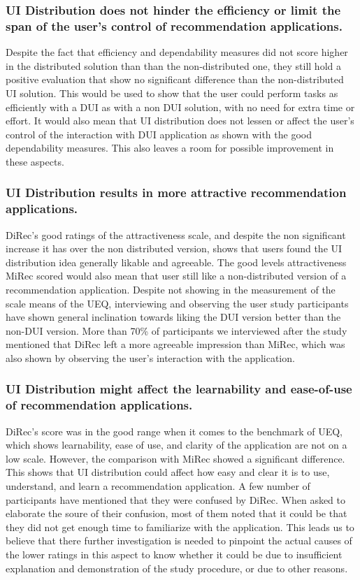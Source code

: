 \subsubsection{UI Distribution does not hinder the efficiency or limit the span
of the user's control of recommendation applications.} Despite the fact that
efficiency and dependability measures did not score higher in the distributed
solution than than the non-distributed one, they still hold a positive
evaluation that show no significant difference than the non-distributed UI
solution. This would be used to show that the user could perform tasks as
efficiently with a DUI as with a non DUI solution, with no need for extra time
or effort. It would also mean that UI distribution does not lessen or affect the
user's control of the interaction with DUI application as shown with the good
dependability measures. This also leaves a room for possible improvement in
these aspects.

\subsubsection{UI Distribution results in more attractive recommendation applications.} DiRec's good ratings of the attractiveness scale, and despite
the non significant increase it has over the non distributed version, shows that
users found the UI distribution idea generally likable and agreeable. The good
levels attractiveness MiRec scored would also mean that user still like a
non-distributed version of a recommendation application. Despite not showing in
the measurement of the scale means of the UEQ, interviewing and observing the
user study participants have shown general inclination towards liking the DUI
version better than the non-DUI version. More than 70\% of participants we
interviewed after the study mentioned that DiRec left a more agreeable
impression than MiRec, which was also shown by observing the user's interaction
with the application.

\subsubsection{UI Distribution might affect the learnability and ease-of-use of recommendation applications.}
DiRec's score was in the good range when it comes to the benchmark of UEQ, which
shows learnability, ease of use, and clarity of the application are not on a low
scale. However, the comparison with MiRec showed a significant difference. This
shows that UI distribution could affect how easy and clear it is to use,
understand, and learn a recommendation application. A few number of participants
have mentioned that they were confused by DiRec. When asked to elaborate the
soure of their confusion, most of them noted that it could be that they did not
get enough time to familiarize with the application. This leads us to believe
that there further investigation is needed to pinpoint the actual causes of the
lower ratings in this aspect to know whether it could be due to insufficient
explanation and demonstration of the study procedure, or due to other reasons.
